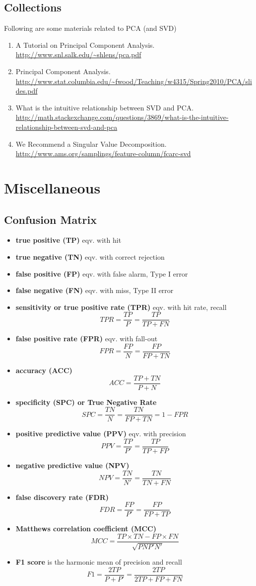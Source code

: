 \documentclass{article}
\begin{document}
\subsection{Collections}
Following are some materials related to PCA (and SVD)
\begin{enumerate}
\item A Tutorial on Principal Component Analysis. \url{http://www.snl.salk.edu/~shlens/pca.pdf}
\item Principal Component Analysis. \url{http://www.stat.columbia.edu/~fwood/Teaching/w4315/Spring2010/PCA/slides.pdf}
\item What is the intuitive relationship between SVD and PCA. \url{http://math.stackexchange.com/questions/3869/what-is-the-intuitive-relationship-between-svd-and-pca}
\item We Recommend a Singular Value Decomposition. \url{http://www.ams.org/samplings/feature-column/fcarc-svd}
\end{enumerate}

\section{Miscellaneous}
\subsection{Confusion Matrix}
\begin{itemize}
\item \textbf{true positive (TP)} eqv. with hit
\item \textbf{true negative (TN)} eqv. with correct rejection
\item \textbf{false positive (FP)} eqv. with false alarm, Type I error
\item \textbf{false negative (FN)} eqv. with miss, Type II error
\item \textbf{sensitivity or true positive rate (TPR)} eqv. with hit rate, recall
      \[
      TPR=\frac{TP}{P}=\frac{TP}{TP+FN}
      \]
\item \textbf{false positive rate (FPR)} eqv. with fall-out
      \[
      FPR=\frac{FP}{N}=\frac{FP}{FP+TN}
      \]
\item \textbf{accuracy (ACC)}
      \[
      ACC=\frac{TP+TN}{P+N}
      \]
\item \textbf{specificity (SPC) or True Negative Rate}
      \[
      SPC=\frac{TN}{N}=\frac{TN}{FP+TN}=1-FPR
      \]
\item \textbf{positive predictive value (PPV)} eqv. with precision
      \[
      PPV=\frac{TP}{P'}=\frac{TP}{TP+FP}
      \]
\item \textbf{negative predictive value (NPV)}
      \[
      NPV=\frac{TN}{N'}=\frac{TN}{TN+FN}
      \]
\item \textbf{false discovery rate (FDR)}
      \[
      FDR=\frac{FP}{P'}=\frac{FP}{FP+TP}
      \]
\item \textbf{Matthews correlation coefficient (MCC)}
      \[
      MCC=\frac{TP\times TN-FP\times FN}{\sqrt{PNP'N'}}
      \]
\item \textbf{F1 score} is the harmonic mean of precision and recall
      \[
      F1=\frac{2TP}{P+P'}=\frac{2TP}{2TP+FP+FN}
      \]
\end{itemize}



\end{document}
